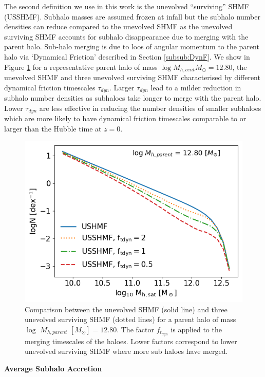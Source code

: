 The second definition we use in this work is the unevolved ``surviving'' SHMF (USSHMF). Subhalo masses are assumed frozen at infall but the subhalo number densities can reduce compared to the unevolved SHMF as the unevolved surviving SHMF accounts for subhalo disappearance due to merging with the parent halo. Sub-halo merging is due to loos of angular momentum to the parent halo via `Dynamical Friction' described in Section \ref{subsub:DynF}. We show in Figure \ref{fig:SHMF_clus} for a representative parent halo of mass $\log M_{h,cent} M_{\odot} = 12.80$, the unevolved SHMF and three unevolved surviving SHMF characterised by different dynamical friction timescales $\tau_{dyn}$. Larger $\tau_{dyn}$ lead to a milder reduction in subhalo number densities as subhaloes take longer to merge with the parent halo. Lower $\tau_{dyn}$ are less effective in reducing the number densities of smaller subhaloes which are more likely to have dynamical friction timescales comparable to or larger than the Hubble time at $z = 0$.
\begin{figure}[h!]
    \centering
    \includegraphics[width = \linewidth]{Figures/Chapter2/SHMF_OneCluster.png}
    \caption{Comparison between the unevolved SHMF (solid line) and three unevolved surviving SHMF  (dotted lines) for a parent halo of mass $\log$ $M_{h,parent}$ $[M_{\odot}] = 12.80$. The factor $f_{t_{dyn}}$ is applied to the merging timescales of the haloes. Lower factors correspond to lower unevolved surviving SHMF where more sub haloes have merged.}
    \label{fig:SHMF_clus}
\end{figure}

\textbf{Average Subhalo Accretion}

